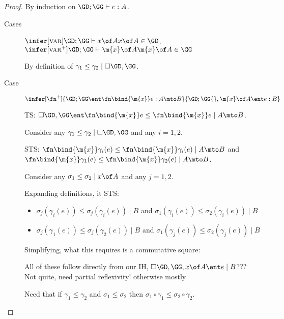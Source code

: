 \documentclass{article}
\newcommand{\lr}[2]{#2\mathrel{|}#1}
\newcommand{\lrcx}[3]{#1 \ent \lr{#2}{#3}}
\begin{document}
\begin{proof}
  By induction on $\GD;\GG \vdash e : A$.
  \begin{description}
  \item[Cases] $\infer[\rt{var}]{\GD;\GG \vdash x \of A}{x \of A \in \GD}$,
    $\infer[\rt{var}^+]{\GD;\GG \vdash \m{x} \of A}{\m{x} \of A \in \GG}$

    By definition of $\lr{\cxdisc{\GD},\GG}{\gamma_1 \le \gamma_2}$.





  \item[Case] $\infer[\fn^+]{\GD;\GG \ent \fn\bind{\m{x}} e : A \mto B}{
    \GD; \GG{},\m{x}\of A \ent e : B}$

    TS: $\lrcx{\cxdisc{\GD},\GG}{A \mto B}{
      \fn\bind{\m{x}} e \le \fn\bind{\m{x}}e}$.

    Consider any $\lr{\cxdisc{\GD},\GG}{\gamma_1 \le \gamma_2}$ and any $i =
    1,2$.

    STS: $\lr{A \mto B}{\fn\bind{\m{x}} \gamma_i(e) \le \fn\bind{\m{x}}
      \gamma_i(e)}$ and $\lr{A \mto B}{\fn\bind{\m{x}} \gamma_1(e) \le
      \fn\bind{\m{x}} \gamma_2(e)}$.

    Consider any $\lr{x \of A}{\sigma_1 \le \sigma_2}$ and any $j = 1,2$.

    Expanding definitions, it STS:
    \begin{itemize}
    \item $\lr{B}{\sigma_j(\gamma_i(e)) \le \sigma_j(\gamma_i(e))}$
      and $\lr{B}{\sigma_1(\gamma_i(e)) \le \sigma_2(\gamma_i(e))}$
    \item $\lr{B}{\sigma_j(\gamma_1(e)) \le \sigma_j(\gamma_2(e))}$
      and $\lr{B}{\sigma_1(\gamma_j(e)) \le \sigma_2(\gamma_j(e))}$
    \end{itemize}

    Simplifying, what this requires is a commutative square: 

    All of these follow directly from our IH, $\lrcx{\cxdisc{\GD},\GG,x\of
      A}{B}{e}$??? Not quite, need partial reflexivity! otherwise mostly

    Need that if $\gamma_1 \le \gamma_2$ and $\sigma_1 \le \sigma_2$ then
    $\sigma_1 \circ \gamma_1 \le \sigma_2\circ\gamma_2$.
  \end{description}
\end{proof}
\end{document}
